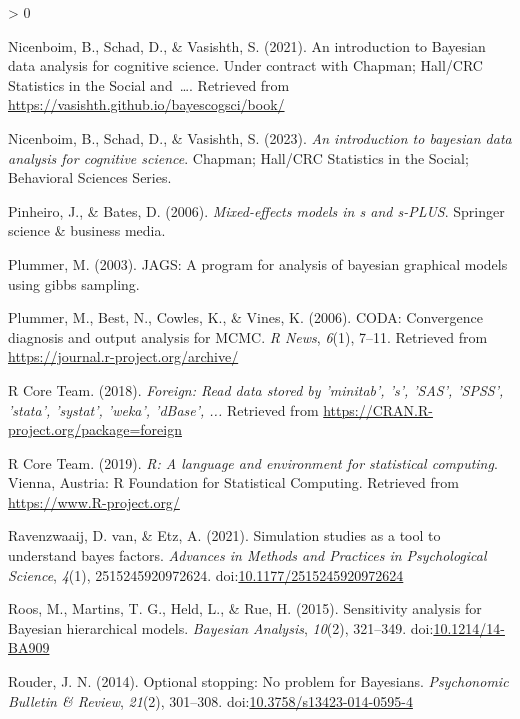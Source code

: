 \documentclass[
  english,
  doc,floatsintext]{apa6}
\newlength{\cslhangindent}
\newenvironment{CSLReferences}[2] %
 {%
  \setlength{\parindent}{0pt}
  \ifodd #1 \everypar{\setlength{\hangindent}{\cslhangindent}}\ignorespaces\fi
  \ifnum #2 > 0
  \setlength{\parskip}{#2\baselineskip}
  \fi
 }%
 {}
\begin{document}
\begin{CSLReferences}{1}{0}
\leavevmode\hypertarget{ref-nicenboim2021introduction}{}%
Nicenboim, B., Schad, D., \& Vasishth, S. (2021). An introduction to {Bayesian} data analysis for cognitive science. Under contract with Chapman; Hall/CRC Statistics in the Social and~\ldots. Retrieved from \url{https://vasishth.github.io/bayescogsci/book/}

\leavevmode\hypertarget{ref-nicenboim2023introduction}{}%
Nicenboim, B., Schad, D., \& Vasishth, S. (2023). \emph{An introduction to bayesian data analysis for cognitive science}. Chapman; Hall/CRC Statistics in the Social; Behavioral Sciences Series.

\leavevmode\hypertarget{ref-pinheiro2006mixed}{}%
Pinheiro, J., \& Bates, D. (2006). \emph{Mixed-effects models in s and s-PLUS}. Springer science \& business media.

\leavevmode\hypertarget{ref-Plummer03jagsa}{}%
Plummer, M. (2003). JAGS: A program for analysis of bayesian graphical models using gibbs sampling.

\leavevmode\hypertarget{ref-R-coda}{}%
Plummer, M., Best, N., Cowles, K., \& Vines, K. (2006). CODA: Convergence diagnosis and output analysis for MCMC. \emph{R News}, \emph{6}(1), 7--11. Retrieved from \url{https://journal.r-project.org/archive/}

\leavevmode\hypertarget{ref-R-foreign}{}%
R Core Team. (2018). \emph{Foreign: Read data stored by 'minitab', 's', 'SAS', 'SPSS', 'stata', 'systat', 'weka', 'dBase', ...} Retrieved from \url{https://CRAN.R-project.org/package=foreign}

\leavevmode\hypertarget{ref-R-base}{}%
R Core Team. (2019). \emph{R: A language and environment for statistical computing}. Vienna, Austria: R Foundation for Statistical Computing. Retrieved from \url{https://www.R-project.org/}

\leavevmode\hypertarget{ref-van2021simulation}{}%
Ravenzwaaij, D. van, \& Etz, A. (2021). Simulation studies as a tool to understand bayes factors. \emph{Advances in Methods and Practices in Psychological Science}, \emph{4}(1), 2515245920972624. doi:\href{https://doi.org/10.1177/2515245920972624}{10.1177/2515245920972624}

\leavevmode\hypertarget{ref-roos2015sensitivity}{}%
Roos, M., Martins, T. G., Held, L., \& Rue, H. (2015). Sensitivity analysis for {Bayesian} hierarchical models. \emph{Bayesian Analysis}, \emph{10}(2), 321--349. doi:\href{https://doi.org/10.1214/14-BA909}{10.1214/14-BA909}

\leavevmode\hypertarget{ref-rouder2014optional}{}%
Rouder, J. N. (2014). Optional stopping: No problem for {Bayesians}. \emph{Psychonomic Bulletin \& Review}, \emph{21}(2), 301--308. doi:\href{https://doi.org/10.3758/s13423-014-0595-4}{10.3758/s13423-014-0595-4}


\end{CSLReferences}
\end{document}
